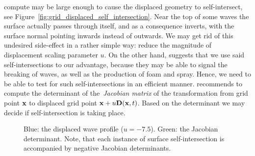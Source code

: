 compute may be large enough to cause the displaced geometry to self-intersect, 
see Figure~\ref{fig:grid_displaced_self_intersection}. Near the top of some 
waves the surface actually passes through itself, and as a consequence inverts, 
with the surface normal pointing inwards instead of outwards. We may get rid of 
this undesired side-effect in a rather simple way: reduce the magnitude of 
displacement scaling parameter $u$.
On the other hand, \citeauthor{course:simulatingocean} suggests that we use
said self-intersections to our advantage, because they may be able to signal
the breaking of waves, as well as the production of foam and spray. Hence, we
need to be able to test for such self-intersections in an efficient manner.
\citeauthor{course:simulatingocean} recommends to 
compute the determinant of the~\emph{Jacobian matrix} of the transformation 
from grid point $\mathbf{x}$ to displaced grid point 
$\mathbf{x}+u\mathbf{D}(\mathbf{x},t)$. Based on the determinant we may decide if 
self-intersection is taking place.
%
%
\begin{figure}
\centering
{}
\caption{Blue: the displaced wave profile ($u = -7.5$). Green: the Jacobian 
determinant. Note, that each instance of surface self-intersection is 
accompanied by negative Jacobian determinants.}
\label{fig:grid_displaced_j}
\end{figure}
